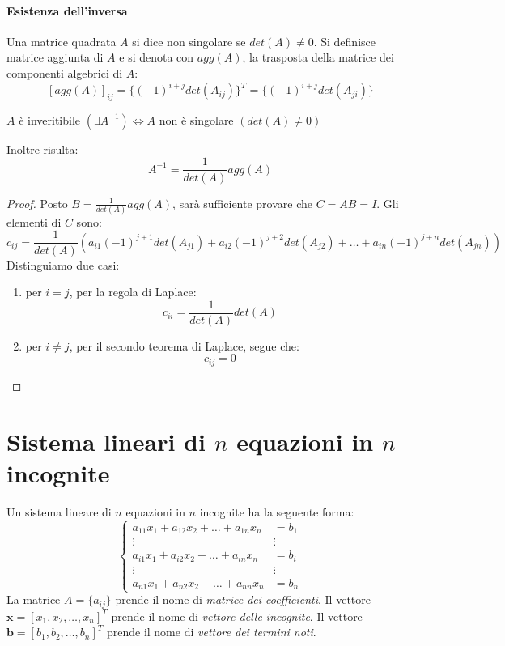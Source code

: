 \documentclass[12pt]{report}
\newcounter{theorem}
\begin{document}
\paragraph{Esistenza dell'inversa} Una matrice quadrata $A$ si dice non singolare se $det(A) \neq 0$. Si definisce matrice aggiunta di  $A$ e si denota con $agg(A)$, la trasposta della matrice dei componenti algebrici di $A$:
\[
[agg(A)]_{ij} = \{(-1)^{i + j}det(A_{ij})\}^T = \{(-1)^{i + j}det(A_{ji})\}
\]
\begin{theorem}{}{}
	$A$ è inveritibile $(\exists A^{-1}) \iff A$ non è singolare $(det(A) \neq 0)$

	Inoltre risulta:
	\[
	A^{-1} = \displaystyle\frac{1}{det(A)}agg(A)
	\]
\end{theorem}
\begin{proof}
	Posto $B = \displaystyle\frac{1}{det(A)}agg(A)$, sarà sufficiente provare che $C = AB = I$. Gli elementi di $C$ sono:
	\[
	c_{ij} = \displaystyle\frac{1}{det(A)}(a_{i1}(-1)^{j+1}det(A_{j1}) + a_{i2}(-1)^{j+2}det(A_{j2}) + \dots + a_{in}(-1)^{j + n}det(A_{jn}))
	\]
	Distinguiamo due casi:
	\begin{enumerate}
		\item per $i=j$, per la regola di Laplace:
		\[
		c_{ii} = \displaystyle\frac{1}{det(A)}det(A)
		\]
		\item per $i \neq j$, per il secondo teorema di Laplace, segue che:
		\[
		c_{ij} = 0
		\]
	\end{enumerate}
\end{proof}
\section{Sistema lineari di $n$ equazioni in $n$ incognite}
Un sistema lineare di $n$ equazioni in $n$ incognite ha la seguente forma:
\begin{equation}
\begin{cases}
a_{11}x_1 + a_{12}x_2 + \dots + a_{1n}x_n &= b_1 \\
\vdots & \vdots \\
a_{i1}x_1 + a_{i2}x_2 + \dots + a_{in}x_n &= b_i \\
\vdots & \vdots \\
a_{n1}x_1 + a_{n2}x_2 + \dots + a_{nn}x_n &= b_n
\end{cases}
\end{equation}
La matrice $A = \{a_{ij}\}$ prende il nome di \textit{matrice dei coefficienti}. Il vettore $\mathbf{x} = [x_1, x_2, \dots, x_n]^T$ prende il nome di \textit{vettore delle incognite}. Il vettore $\mathbf{b} = [b_1, b_2, \dots, b_n]^T$ prende il nome di \textit{vettore dei termini noti}.
\end{document}
